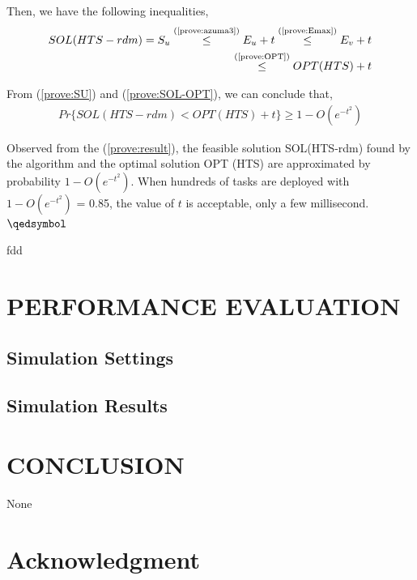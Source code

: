 \documentclass[conference]{IEEEtran}
\begin{document}
Then, we have the following inequalities,
\begin{align}
SOL(HTS-rdm) = S_u  
\overset{\text{(\ref{prove:azuma3})}}{\leq}  E_u+t
\overset{\text{(\ref{prove:Emax})}}{\leq} E_v+t\nonumber\\
\overset{\text{(\ref{prove:OPT})}}{\leq} OPT(HTS)+t\label{prove:SOL-OPT}
\end{align}

From (\ref{prove:SU}) and (\ref{prove:SOL-OPT}), we can conclude that,
\begin{align}
Pr\{SOL(HTS-rdm)<OPT (HTS)+t\} \geq 1 - O(e^{-t^2})\label{prove:result}
\end{align}

Observed from the (\ref{prove:result}), the feasible solution SOL(HTS-rdm) found by the algorithm and the optimal solution OPT (HTS) are approximated by probability $1 - O(e^{-t^2})$. When hundreds of tasks are deployed with $1 - O(e^{-t^2})$ = 0.85, the value of $t$ is acceptable, only a few millisecond.\hfill $\qedsymbol$


fdd
\section{PERFORMANCE EVALUATION}\label{PERFORMANCE_EVALUATION}
\subsection{Simulation Settings}\label{SCM}

\subsection{Simulation Results}

%







\section{CONCLUSION}\label{CONCLUSION}
None

\section*{Acknowledgment}
\end{document}
